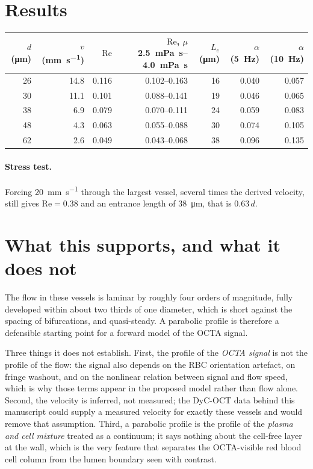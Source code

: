 \documentclass[11pt,a4paper]{article}
\begin{document}
\section*{Results}
\begin{tabular}{@{}rrrrrrr@{}}
\toprule
$d$ (\si{\micro\metre}) & $v$ (\si{\milli\metre\per\second}) & $\mathrm{Re}$ & $\mathrm{Re}$, $\mu$ \SIrange{2.5}{4.0}{\milli\pascal\second} & $L_e$ (\si{\micro\metre}) & $\alpha$ (\SI{5}{\hertz}) & $\alpha$ (\SI{10}{\hertz}) \\ \midrule
26 & 14.8 & 0.116 & 0.102--0.163 & 16 & 0.040 & 0.057 \\
30 & 11.1 & 0.101 & 0.088--0.141 & 19 & 0.046 & 0.065 \\
38 & 6.9 & 0.079 & 0.070--0.111 & 24 & 0.059 & 0.083 \\
48 & 4.3 & 0.063 & 0.055--0.088 & 30 & 0.074 & 0.105 \\
62 & 2.6 & 0.049 & 0.043--0.068 & 38 & 0.096 & 0.135 \\
\bottomrule
\end{tabular}

\paragraph{Stress test.} Forcing \SI{20}{\milli\metre\per\second} through the largest vessel, several times
the derived velocity, still gives $\mathrm{Re} = 0.38$ and an entrance length of \SI{38}{\micro\metre},
that is $0.63\,d$.

\section*{What this supports, and what it does not}
The flow in these vessels is laminar by roughly four orders of magnitude, fully developed within about two
thirds of one diameter, which is short against the spacing of bifurcations, and quasi-steady. A parabolic
profile is therefore a defensible starting point for a forward model of the OCTA signal.

Three things it does not establish. First, the profile of the \textit{OCTA signal} is not the profile of the
flow: the signal also depends on the RBC orientation artefact, on fringe washout, and on the nonlinear
relation between signal and flow speed, which is why those terms appear in the proposed model rather than flow
alone. Second, the velocity is inferred, not measured; the DyC-OCT data behind this manuscript could supply a
measured velocity for exactly these vessels and would remove that assumption. Third, a parabolic profile is
the profile of the \textit{plasma and cell mixture} treated as a continuum; it says nothing about the cell-free
layer at the wall, which is the very feature that separates the OCTA-visible red blood cell column from the
lumen boundary seen with contrast.
\end{document}
